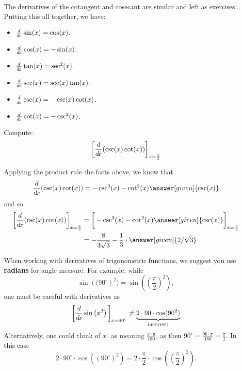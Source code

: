\documentclass{ximera}
\begin{document}
The derivatives of the cotangent and cosecant are similar and left as
exercises.  Putting this all together, we have:

\begin{theorem} \hfil
\begin{itemize}
\item $\frac{d}{\mathop{}\!d\! x} \sin(x) = \cos(x)$.
\item $\frac{d}{\mathop{}\!d\! x} \cos(x) = -\sin(x)$.
\item $\frac{d}{\mathop{}\!d\! x} \tan(x) = \sec^2(x)$.
\item $\frac{d}{\mathop{}\!d\! x} \sec(x) = \sec(x)\tan(x)$.
\item $\frac{d}{\mathop{}\!d\! x} \csc(x) = -\csc(x)\cot(x)$.
\item $\frac{d}{\mathop{}\!d\! x} \cot(x) = -\csc^2(x)$.
\end{itemize}
\end{theorem}

\begin{example}
Compute:
\[
\bigg[ \frac{d}{\mathop{}\!d\! x} ( \csc(x) \cot(x) ) \bigg]_{x=\frac{\pi}{3}}
\]
\begin{explanation}
Applying the product rule the facts above, we know that
\[
\ddx ( \csc(x) \cot(x) ) = - \csc^3(x) - \cot^2(x)\answer[given]{\csc(x)}
\]
and so
\begin{align*}
\eval{\ddx ( \csc(x) \cot(x) )}_{x=\frac{\pi}{3}} &= \eval{  - \csc^3(x) - \cot^2(x) \answer[given]{\csc(x)}}_{x=\frac{\pi}{3}}  \\
&= - \frac{8}{3 \sqrt{3}} - \frac{1}{3}\cdot \answer[given]{2/\sqrt{3}}
\end{align*}
\end{explanation}
\end{example}


\begin{warning}
When working with derivatives of trigonometric functions, we suggest
you use \textbf{radians} for angle measure. For example, while
\[
\sin\left((90^\circ\right)^2) = \sin\left(\left(\frac{\pi}{2}\right)^2\right),
\]
one must be careful with derivatives as
\[
\bigg[ \frac{d}{\mathop{}\!d\! x} \sin\left(x^2\right) \bigg]_{x=90^\circ} \ne \underbrace{2\cdot 90\cdot \cos(90^2)}_{\text{incorrect}}
\]
Alternatively, one could think of $x^\circ$ as meaning
$\frac{x\cdot\pi}{180}$, as then $90^\circ = \frac{90\cdot\pi}{180} =
\frac{\pi}{2}$. In this case
\[
2\cdot 90^\circ\cdot \cos((90^\circ)^2) = 2\cdot \frac{\pi}{2}\cdot\cos\left(\left(\frac{\pi}{2}\right)^2\right).
\]
\end{warning}
\end{document}
